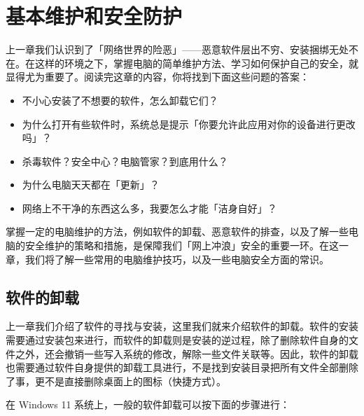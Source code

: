 \chapter{基本维护和安全防护}
\label{cha:basic-maintenance}

\begin{intro}
  上一章我们认识到了「网络世界的险恶」——恶意软件层出不穷、安装捆绑无处不在。在这样的环境之下，掌握电脑的简单维护方法、学习如何保护自己的安全，就显得尤为重要了。阅读完这章的内容，你将找到下面这些问题的答案：
  \begin{itemize}
    \item 不小心安装了不想要的软件，怎么卸载它们？
    \item 为什么打开有些软件时，系统总是提示「你要允许此应用对你的设备进行更改吗」？
    \item 杀毒软件？安全中心？电脑管家？到底用什么？
    \item 为什么电脑天天都在「更新」？
    \item 网络上不干净的东西这么多，我要怎么才能「洁身自好」？
  \end{itemize}
\end{intro}

掌握一定的电脑维护的方法，例如软件的卸载、恶意软件的排查，以及了解一些电脑的安全维护的策略和措施，是保障我们「网上冲浪」安全的重要一环。在这一章，我们将了解一些常用的电脑维护技巧，以及一些电脑安全方面的常识。

\section{软件的卸载}

上一章我们介绍了软件的寻找与安装，这里我们就来介绍软件的卸载。软件的安装需要通过安装包来进行，而软件的卸载则是安装的逆过程，除了删除软件自身的文件之外，还会撤销一些写入系统的修改，解除一些文件关联等。因此，软件的卸载也需要通过软件自身提供的卸载工具进行，不是找到安装目录把所有文件全部删除了事，更不是直接删除桌面上的图标（快捷方式）。

在 Windows 11 系统上，一般的软件卸载可以按下面的步骤进行：

